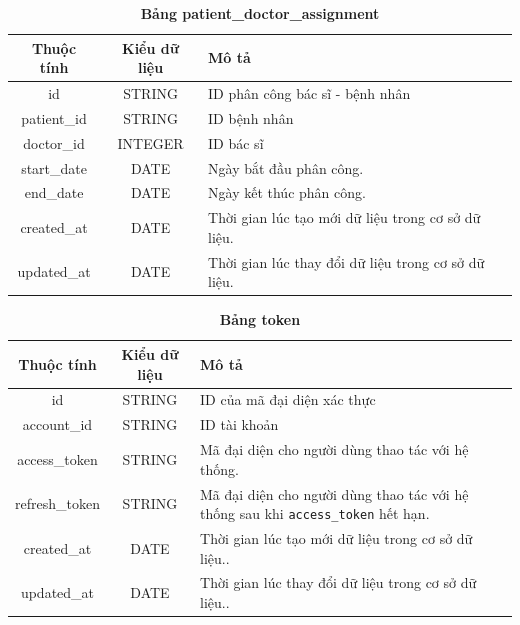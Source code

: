 \begin{table}[H]
  \caption{\bfseries \fontsize{12pt}{0pt}\selectfont Bảng patient\_doctor\_assignment}
  \centering
  \begin{tabularx}{0.9\textwidth}{|c|c|X|}
    \hline
    \textbf{Thuộc tính} & \textbf{Kiểu dữ liệu} & \textbf{Mô tả} \\
    \hline
    id & STRING & ID phân công bác sĩ - bệnh nhân  \\
    \hline
    patient\_id & STRING & ID bệnh nhân  \\
    \hline
    doctor\_id & INTEGER & ID bác sĩ  \\
    \hline
    start\_date & DATE & Ngày bắt đầu phân công. \\
    \hline
    end\_date & DATE & Ngày kết thúc phân công. \\
    \hline
    created\_at & DATE & Thời gian lúc tạo mới dữ liệu trong cơ sở dữ liệu. \\
    \hline
    updated\_at & DATE & Thời gian lúc thay đổi dữ liệu trong cơ sở dữ liệu. \\
    \hline
  \end{tabularx}
\end{table}

\begin{table}[H]
  \caption{\bfseries \fontsize{12pt}{0pt}\selectfont Bảng token}
  \centering
  \begin{tabularx}{0.9\textwidth}{|c|c|X|}
    \hline
    \textbf{Thuộc tính} & \textbf{Kiểu dữ liệu} & \textbf{Mô tả} \\
    \hline
    id & STRING & ID của mã đại diện xác thực  \\
    \hline
    account\_id & STRING & ID tài khoản  \\
    \hline
    access\_token & STRING & Mã đại diện cho người dùng thao tác với hệ thống. \\
    \hline
    refresh\_token & STRING & Mã đại diện cho người dùng thao tác với hệ thống sau khi \texttt{access\_token} hết hạn. \\
    \hline
    created\_at & DATE & Thời gian lúc tạo mới dữ liệu trong cơ sở dữ liệu.. \\
    \hline
    updated\_at & DATE & Thời gian lúc thay đổi dữ liệu trong cơ sở dữ liệu.. \\
    \hline
  \end{tabularx}
\end{table}




